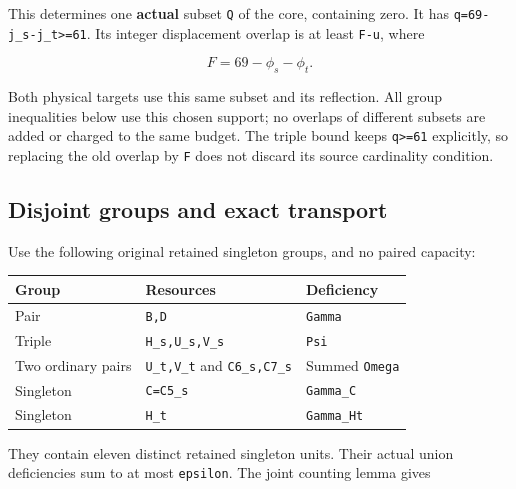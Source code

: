 \documentclass[10pt,a4paper]{article}
\theoremstyle{definition}
\begin{document}
This determines one \textbf{actual} subset \texttt{Q}
of the core,\allowbreak{} containing zero. It has
\texttt{q=\allowbreak{}69-j\_\allowbreak{}\allowbreak{}s-j\_\allowbreak{}\allowbreak{}t>=\allowbreak{}61}. Its integer displacement
overlap is at least \texttt{F-u},\allowbreak{} where

\[
 F=\allowbreak{}69-\phi_s-\phi_t.
\]

Both physical targets use this same subset and its reflection. All group
inequalities below use this chosen support; no overlaps of different
subsets are added or charged to the same budget. The triple bound keeps
\texttt{q>=\allowbreak{}61} explicitly,\allowbreak{} so replacing the old overlap
by \texttt{F} does not discard its source cardinality
condition.

\hypertarget{disjoint-groups-and-exact-transport}{%
\subsection{Disjoint groups and exact
transport}\label{disjoint-groups-and-exact-transport}}

Use the following original retained singleton groups,\allowbreak{} and no paired
capacity:

\begin{longtable}[]{@{}lll@{}}
\toprule\noalign{}
Group & Resources & Deficiency \\
\midrule\noalign{}
\endhead
\bottomrule\noalign{}
\endlastfoot
Pair & \texttt{B,\allowbreak{}D} &
\texttt{Gamma} \\
Triple & \texttt{H\_\allowbreak{}\allowbreak{}s,\allowbreak{}U\_\allowbreak{}\allowbreak{}s,\allowbreak{}V\_\allowbreak{}\allowbreak{}s} &
\texttt{Psi} \\
Two ordinary pairs & \texttt{U\_\allowbreak{}\allowbreak{}t,\allowbreak{}V\_\allowbreak{}\allowbreak{}t} and
\texttt{C6\_\allowbreak{}\allowbreak{}s,\allowbreak{}C7\_\allowbreak{}\allowbreak{}s} & Summed
\texttt{Omega} \\
Singleton & \texttt{C=\allowbreak{}C5\_\allowbreak{}\allowbreak{}s} &
\texttt{Gamma\_\allowbreak{}\allowbreak{}C} \\
Singleton & \texttt{H\_\allowbreak{}\allowbreak{}t} &
\texttt{Gamma\_\allowbreak{}\allowbreak{}Ht} \\
\end{longtable}

They contain eleven distinct retained singleton units. Their actual
union deficiencies sum to at most \texttt{epsilon}. The
joint counting lemma gives
\end{document}
